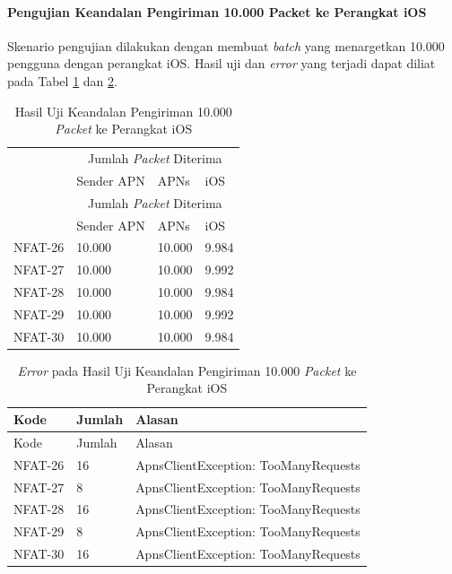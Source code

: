 \paragraph{Pengujian Keandalan Pengiriman 10.000 Packet ke Perangkat iOS}
\par Skenario pengujian dilakukan dengan membuat \textit{batch} yang menargetkan 10.000 pengguna dengan perangkat iOS. Hasil uji dan \textit{error} yang terjadi dapat diliat pada Tabel \ref{t:keandalan-ios-10k} dan \ref{t:error-keandalan-ios-10k}.
\begin{longtable}{|p{1.5cm}|p{2cm}|p{2cm}|p{2cm}|}
	\caption{Hasil Uji Keandalan Pengiriman 10.000 \textit{Packet} ke Perangkat iOS} \label{t:keandalan-ios-10k} \\ \hline
	\rowcolor{lightgray} & \multicolumn{3}{c|}{Jumlah \textit{Packet} Diterima} \\ \hhline{~|*3{-}|}
	\rowcolor{lightgray} \multirow{-2}{*}{Kode} & Sender APN & APNs & iOS \\ \hline
	\endfirsthead
	\hline
	\rowcolor{lightgray} & \multicolumn{3}{c|}{Jumlah \textit{Packet} Diterima} \\ \hhline{~|*3{-}|}
	\rowcolor{lightgray} \multirow{-2}{*}{Kode} & Sender APN & APNs & iOS \\ \hline
	\endhead
	NFAT-26 & 10.000 & 10.000 & 9.984 \\ \hline
	NFAT-27 & 10.000 & 10.000 & 9.992 \\ \hline
	NFAT-28 & 10.000 & 10.000 & 9.984 \\ \hline
	NFAT-29 & 10.000 & 10.000 & 9.992 \\ \hline
	NFAT-30 & 10.000 & 10.000 & 9.984 \\ \hline
\end{longtable}
\begin{longtable}{|p{1.5cm}|p{1.5cm}|p{4cm}|}
	\caption{\textit{Error} pada Hasil Uji Keandalan Pengiriman 10.000 \textit{Packet} ke Perangkat iOS} \label{t:error-keandalan-ios-10k} \\ \hline
	\rowcolor{lightgray} Kode & Jumlah & Alasan \\ \hline
	\endfirsthead
	\hline
	\rowcolor{lightgray} Kode & Jumlah & Alasan \\ \hline
	\endhead
	NFAT-26 & 16 & ApnsClientException: TooManyRequests \\ \hline
	NFAT-27 & 8 & ApnsClientException: TooManyRequests \\ \hline
	NFAT-28 & 16 & ApnsClientException: TooManyRequests \\ \hline
	NFAT-29 & 8 & ApnsClientException: TooManyRequests \\ \hline
	NFAT-30 & 16 & ApnsClientException: TooManyRequests \\ \hline
\end{longtable}

